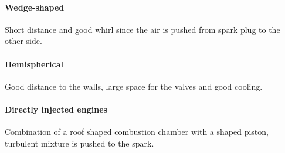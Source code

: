 	\paragraph{Wedge-shaped}
	Short distance and good whirl since the air is pushed from spark plug to the other side. 
	
	\paragraph{Hemispherical}
	Good distance to the walls, large space for the valves and good cooling. 
	
	\paragraph{Directly injected engines}
	Combination of a roof shaped combustion chamber with a shaped piston, turbulent mixture is pushed to the spark. 